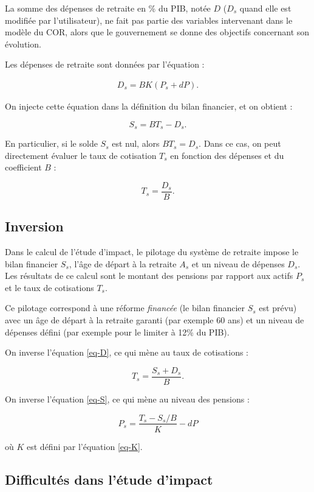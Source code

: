\documentclass[10pt]{article}
\begin{document}
La somme des dépenses de retraite en \% du PIB, notée $D$ ($D_s$ quand elle est modifiée par l'utilisateur), ne fait pas partie des variables intervenant dans le modèle du COR, alors que le gouvernement se donne des objectifs concernant son évolution.

Les dépenses de retraite sont données par l'équation :

\begin{eqnarray}
D_s =  B K(P_s + dP). \label{eq-D}
\end{eqnarray}

On injecte cette équation dans la définition du bilan financier, et on obtient :

$$
S_s =  B T_s - D_s.
$$

En particulier, si le solde $S_s$ est nul, alors 
$B T_s = D_s$.
Dans ce cas, on peut directement évaluer le taux de cotisation 
$T_s$ en fonction des dépenses et du coefficient $B$ :

$$
T_s = \frac{D_s}{B}.
$$


\subsection{Inversion}
\label{section-inversion}

Dans le calcul de l'étude d'impact, le pilotage du système de retraite impose 
le bilan financier $S_s$, l'âge de départ à la retraite $A_s$ et 
un niveau de dépenses $D_s$. 
Les résultats de ce calcul sont le montant des pensions par rapport aux actifs $P_s$ et le taux de cotisations $T_s$.

Ce pilotage correspond à une réforme \emph{financée} 
(le bilan financier $S_s$ est prévu) avec un âge de départ 
à la retraite garanti (par exemple 60 ans) et un niveau de 
dépenses défini (par exemple pour le limiter à 12\% du PIB).

On inverse l'équation \ref{eq-D}, ce qui mène au taux de cotisations :

$$
T_s = \frac{S_s + D_s}{B}.
$$

On inverse l'équation \ref{eq-S}, ce qui mène au niveau des pensions :

$$
P_s = \frac{T_s - S_s / B}{K} - dP
$$

où $K$ est défini par l'équation \ref{eq-K}. 


\subsection{Difficultés dans l'étude d'impact}
\end{document}
